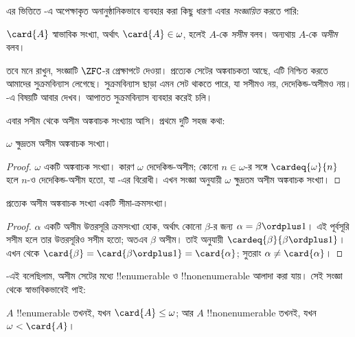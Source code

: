 \documentclass[../../../include/open-logic-section]{subfiles}
\begin{document}
এর ভিত্তিতে -এ অপেক্ষাকৃত
অনানুষ্ঠানিকভাবে ব্যবহার করা কিছু ধারণা এবার
\emph{সংজ্ঞায়িত} করতে পারি:

\begin{defn}
$\card{A}$ স্বাভাবিক সংখ্যা, অর্থাৎ $\card{A}\in\omega$,
হলেই $A$-কে \emph{সসীম} বলব। অন্যথায় $A$-কে
\emph{অসীম} বলব।
\end{defn}
\noindent
তবে মনে রাখুন, সংজ্ঞাটি $\ZFC$-র প্রেক্ষাপটে দেওয়া।
প্রত্যেক সেটের অঙ্কবাচকতা আছে, এটি নিশ্চিত করতে
আমাদের সুক্রমবিন্যাস লেগেছে। সুক্রমবিন্যাস ছাড়া এমন
সেট থাকতে পারে, যা সসীমও নয়, দেদেকিন্ড-অসীমও নয়।
-এ বিষয়টি আবার দেখব। আপাতত
সুক্রমবিন্যাস ব্যবহার করেই চলি।

এবার সসীম থেকে অসীম অঙ্কবাচক সংখ্যায় আসি।
প্রথমে দুটি সহজ কথা:

\begin{cor}
$\omega$ ক্ষুদ্রতম অসীম অঙ্কবাচক সংখ্যা।
\end{cor}

\begin{proof}
$\omega$ একটি অঙ্কবাচক সংখ্যা। কারণ $\omega$
দেদেকিন্ড-অসীম; কোনো $n\in\omega$-র সঙ্গে
$\cardeq{\omega}{n}$ হলে $n$-ও দেদেকিন্ড-অসীম হতো,
যা -এর
বিরোধী। এখন সংজ্ঞা অনুযায়ী $\omega$ ক্ষুদ্রতম
অসীম অঙ্কবাচক সংখ্যা।
\end{proof}

\begin{cor}
প্রত্যেক অসীম অঙ্কবাচক সংখ্যা একটি সীমা-ক্রমসংখ্যা।
\end{cor}

\begin{proof}
$\alpha$ একটি অসীম উত্তরসূরি ক্রমসংখ্যা হোক, অর্থাৎ
কোনো $\beta$-র জন্য $\alpha=\beta\ordplus 1$।
এই পূর্বসূরি সসীম হলে তার উত্তরসূরিও সসীম হতো;
অতএব $\beta$ অসীম। তাই
অনুযায়ী $\cardeq{\beta}{\beta\ordplus 1}$। এখন
 থেকে
$\card{\beta}=\card{\beta\ordplus 1}=\card{\alpha}$;
সুতরাং $\alpha\neq\card{\alpha}$।
\end{proof}

-এই বলেছিলাম,
অসীম সেটের মধ্যে !!{enumerable} ও !!{nonenumerable}
আলাদা করা যায়। সেই সংজ্ঞা থেকে স্বাভাবিকভাবেই পাই:

\begin{prop}
$A$ !!{enumerable} তখনই, যখন $\card{A}\leq\omega$;
আর $A$ !!{nonenumerable} তখনই, যখন $\omega<\card{A}$।
\end{prop}
\end{document}
